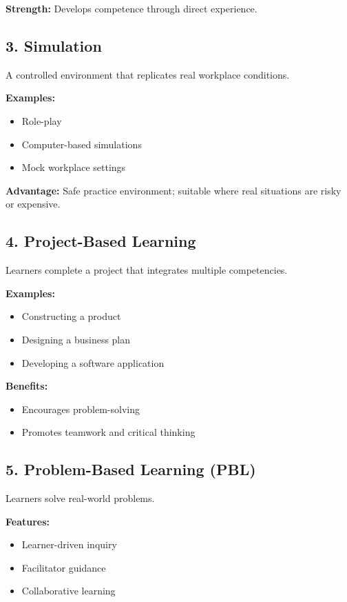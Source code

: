 \documentclass[12pt,a4paper]{article}
\begin{document}
\textbf{Strength:} Develops competence through direct experience.

\subsection*{3. Simulation}
A controlled environment that replicates real workplace conditions.

\textbf{Examples:}
\begin{itemize}
    \item Role-play
    \item Computer-based simulations
    \item Mock workplace settings
\end{itemize}

\textbf{Advantage:} Safe practice environment; suitable where real situations are risky or expensive.

\subsection*{4. Project-Based Learning}
Learners complete a project that integrates multiple competencies.

\textbf{Examples:}
\begin{itemize}
    \item Constructing a product
    \item Designing a business plan
    \item Developing a software application
\end{itemize}

\textbf{Benefits:}
\begin{itemize}
    \item Encourages problem-solving
    \item Promotes teamwork and critical thinking
\end{itemize}

\subsection*{5. Problem-Based Learning (PBL)}
Learners solve real-world problems.

\textbf{Features:}
\begin{itemize}
    \item Learner-driven inquiry
    \item Facilitator guidance
    \item Collaborative learning
\end{itemize}
\end{document}
